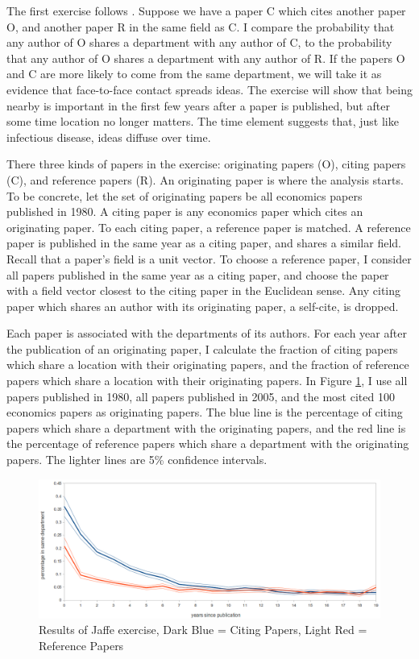 The first exercise follows \citet{jaffe1993geographic}. Suppose we have 
a paper C which cites another paper O, and another paper R in the same
field as C.  I compare the probability that any author of O shares a
department with any author of C, to the probability that any author of O
shares a department with any author of R.  If the papers O and C are more likely
to come from the same department, we will take it as evidence that
face-to-face contact spreads ideas. The exercise will show that being
nearby is important in the first few years after a paper is published,
but after some time location no longer matters. The time element
suggests that, just like infectious disease, ideas diffuse over time.

There three kinds of papers in the exercise: originating papers (O), citing
papers (C), and reference papers (R). An originating paper is where the analysis
starts. To be concrete, let the set of originating papers be all
economics papers published in 1980. A citing paper is any economics
paper which cites an originating paper. To each citing paper, a
reference paper is matched. A reference paper is published in the same
year as a citing paper, and shares a similar field. Recall that a
paper's field is a unit vector. To choose a reference paper, I consider
all papers published in the same year as a citing paper, and choose the
paper with a field vector closest to the citing paper in the Euclidean
sense. Any citing paper which shares an author with its originating
paper, a self-cite, is dropped.

Each paper is associated with the departments of its authors. For each
year after the publication of an originating paper, I calculate the
fraction of citing papers which share a location with their originating
papers, and the fraction of reference papers which share a location with
their originating papers. In Figure \ref{fig:jaf_ex}, I use all papers published in
1980, all papers published in 2005, and the most cited 100 economics
papers as originating papers. The blue line is the percentage of citing
papers which share a department with the originating papers, and the red
line is the percentage of reference papers which share a department with
the originating papers. The lighter lines are 5\% confidence intervals.

\begin{figure}[htbp]
\centering
\includegraphics{pics/jaf_results_pooled.png}
\caption{Results of Jaffe exercise, Dark Blue = Citing Papers, Light Red =
Reference Papers}
\label{fig:jaf_ex}
\end{figure}

